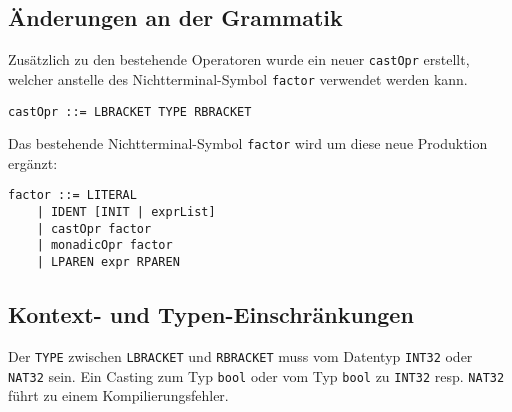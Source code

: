 \documentclass[10pt, a4paper, twocolumn]{article} %
\begin{document}
\subsection{Änderungen an der Grammatik}
Zusätzlich zu den bestehende Operatoren wurde ein neuer \texttt{castOpr} erstellt, welcher anstelle des Nichtterminal-Symbol \texttt{factor} verwendet werden kann.
\begin{lstlisting}[backgroundcolor = \color{lightgray},
xleftmargin = 0.05cm,
framexleftmargin = 0.05em]
    castOpr ::= LBRACKET TYPE RBRACKET
\end{lstlisting}
Das bestehende Nichtterminal-Symbol \texttt{factor} wird um diese neue Produktion ergänzt:
\begin{lstlisting}[backgroundcolor = \color{lightgray},
xleftmargin = 0.05cm,
framexleftmargin = 0.05em]
    factor ::= LITERAL
    | IDENT [INIT | exprList]
    | castOpr factor
    | monadicOpr factor
    | LPAREN expr RPAREN
\end{lstlisting}

\subsection{Kontext- und Typen-Einschränkungen}
Der \texttt{TYPE} zwischen \texttt{LBRACKET} und \texttt{RBRACKET} muss vom Datentyp \texttt{INT32} oder \texttt{NAT32} sein.
Ein Casting zum Typ \texttt{bool} oder vom Typ \texttt{bool} zu \texttt{INT32} resp. \texttt{NAT32} führt zu einem Kompilierungsfehler.
\end{document}
